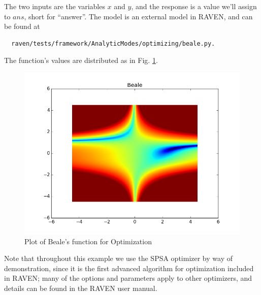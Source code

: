 The two inputs are the variables $x$ and $y$, and the response is a value we'll assign to $ans$, short for
``answer''.  The model is an external model in RAVEN, and can be found at
\begin{verbatim}
  raven/tests/framework/AnalyticModes/optimizing/beale.py.
\end{verbatim}
The function's values are distributed as in Fig. \ref{fig:beale}.
\begin{figure}[h!]
  \centering
  \includegraphics[scale=0.7]{../../tests/framework/user_guide/optimizing/Beale_grid.png}
  \caption{Plot of Beale's function for Optimization}
  \label{fig:beale}
\end{figure}

Note that throughout this example we use the SPSA optimizer by way of demonstration, since it is the first
advanced algorithm for optimization included in RAVEN; many of the options and parameters apply to other
optimizers, and details can be found in the RAVEN user manual.

